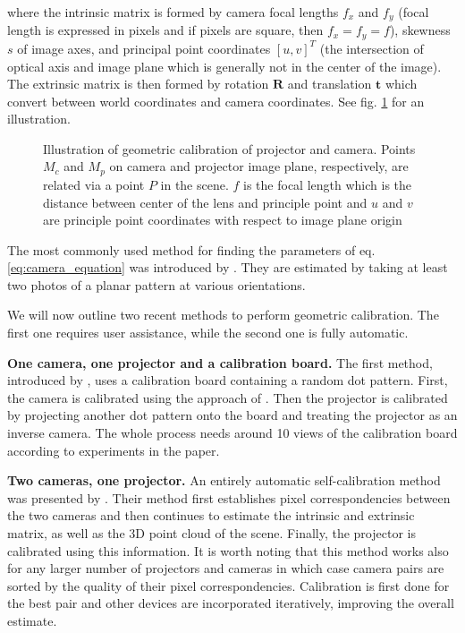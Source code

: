 where the intrinsic matrix is formed by camera focal lengths \(f_x\) and \(f_y\) (focal length is expressed in pixels and if pixels are square, then \(f_x = f_y = f\)), skewness \(s\) of image axes, and principal point coordinates \([u, v]^T\) (the intersection of optical axis and image plane which is generally not in the center of the image). The extrinsic matrix is then formed by rotation \(\mathbf{R}\) and translation \(\mathbf{t}\) which convert between world coordinates and camera coordinates. See fig. \ref{fig:background_camera_calibration} for an illustration.

\begin{figure}[ht]
    \centering
    \def\svgwidth{0.8\textwidth}
    
    \caption{Illustration of geometric calibration of projector and camera. Points \(M_c\) and \(M_p\) on camera and projector image plane, respectively, are related via a point \(P\) in the scene. \(f\) is the focal length which is the distance between center of the lens and principle point and \(u\) and \(v\) are principle point coordinates with respect to image plane origin}
    \label{fig:background_camera_calibration}
\end{figure}

The most commonly used method for finding the parameters of eq. \ref{eq:camera_equation} was introduced by \citet{Zhang1999}. They are estimated by taking at least two photos of a planar pattern at various orientations.

We will now outline two recent methods to perform geometric calibration. The first one requires user assistance, while the second one is fully automatic.

\textbf{One camera, one projector and a calibration board.} The first method, introduced by \citet{Yang2016}, uses a calibration board containing a random dot pattern. First, the camera is calibrated using the approach of \citet{Zhang1999}. Then the projector is calibrated by projecting another dot pattern onto the board and treating the projector as an inverse camera. The whole process needs around 10 views of the calibration board according to experiments in the paper.

\textbf{Two cameras, one projector.} An entirely automatic self-calibration method was presented by \citet{Willi2017}. Their method first establishes pixel correspondencies between the two cameras and then continues to estimate the intrinsic and extrinsic matrix, as well as the 3D point cloud of the scene. Finally, the projector is calibrated using this information. It is worth noting that this method works also for any larger number of projectors and cameras in which case camera pairs are sorted by the quality of their pixel correspondencies. Calibration is first done for the best pair and other devices are incorporated iteratively, improving the overall estimate.

